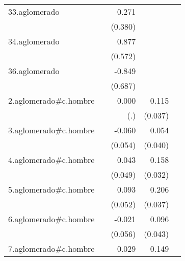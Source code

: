 {\begin{longtable}{l*{4}{D{.}{.}{-1}}}
\addlinespace
33.aglomerado&                     &       0.271         &                     &                     \\
            &                     &     (0.380)         &                     &                     \\
\addlinespace
34.aglomerado&                     &       0.877         &                     &                     \\
            &                     &     (0.572)         &                     &                     \\
\addlinespace
36.aglomerado&                     &      -0.849         &                     &                     \\
            &                     &     (0.687)         &                     &                     \\
\addlinespace
2.aglomerado#c.hombre&                     &       0.000         &       0.115\sym{**} &                     \\
            &                     &         (.)         &     (0.037)         &                     \\
\addlinespace
3.aglomerado#c.hombre&                     &      -0.060         &       0.054         &                     \\
            &                     &     (0.054)         &     (0.040)         &                     \\
\addlinespace
4.aglomerado#c.hombre&                     &       0.043         &       0.158\sym{***}&                     \\
            &                     &     (0.049)         &     (0.032)         &                     \\
\addlinespace
5.aglomerado#c.hombre&                     &       0.093         &       0.206\sym{***}&                     \\
            &                     &     (0.052)         &     (0.037)         &                     \\
\addlinespace
6.aglomerado#c.hombre&                     &      -0.021         &       0.096\sym{*}  &                     \\
            &                     &     (0.056)         &     (0.043)         &                     \\
\addlinespace
7.aglomerado#c.hombre&                     &       0.029         &       0.149\sym{***}&                     \\

\end{longtable}}

